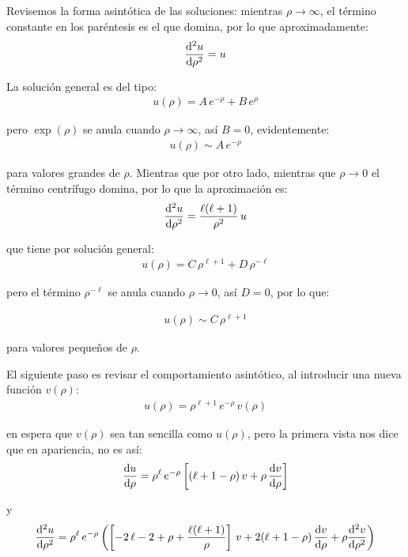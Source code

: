 Revisemos la forma asintótica de las soluciones: mientras $\rho \to \infty$, el término constante en los paréntesis es el que domina, por lo que aproximadamente:
\begin{align*}
\dv[2]{u}{\rho} = u
\end{align*}

La solución general es del tipo:
\begin{align}
u(\rho) = A \, e^{-\rho} + B \, e^{\rho}
\label{eq:ecuacion_04_57}
\end{align}

pero $\exp(\rho)$ se anula cuando $\rho \to \infty$, así $B = 0$, evidentemente:
\begin{align}
u(\rho) \sim A \, e^{-\rho}
\label{eq:ecuacion_04_58}
\end{align}

para valores grandes de $\rho$. Mientras que por otro lado, mientras que $\rho \to 0$ el término centrífugo domina, por lo que la aproximación es:
\begin{align*}
\dv[2]{u}{\rho} = \dfrac{\ell (\ell + 1)}{\rho^{2}} \, u
\end{align*}

que tiene por solución general:
\begin{align*}
u(\rho) = C \, \rho^{\ell +1} + D \, \rho^{-\ell}
\end{align*}

pero el término $\rho^{-\ell}$ se anula cuando $\rho \to 0$, así $D = 0$, por lo que:

\begin{align}
u(\rho) \sim C \, \rho^{\ell + 1}
\label{eq:ecuacion_04_59}
\end{align}

para valores pequeños de $\rho$.
\par
El siguiente paso es revisar el comportamiento asintótico, al introducir una nueva función $v(\rho)$:
\begin{align}
u(\rho) = \rho^{\ell + 1} \, e^{-\rho} \, v(\rho)
\label{eq:ecuacion_04_60} 
\end{align}

en espera que $v(\rho)$ sea tan sencilla como $u(\rho)$, pero la primera vista nos dice que en apariencia, no es así:
\begin{align*}
\dv{u}{\rho} = \rho^{\ell} \, e^{-\rho} \left[ (\ell + 1 - \rho) \, v + \rho \, \dv{v}{\rho} \right]
\end{align*}

y
\begin{align*}
\dv[2]{u}{\rho} = \rho^{\ell} \, e^{-\rho} \left( \left[ -2 \, \ell - 2 + \rho + \dfrac{ \ell (\ell + 1)}{\rho} \right] \, v + 2 (\ell + 1 - \rho) \, \dv{v}{\rho} + \rho \dv[2]{v}{\rho} \right)
\end{align*}

